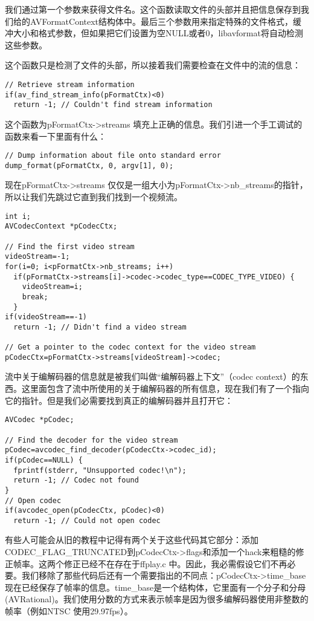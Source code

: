 我们通过第一个参数来获得文件名。这个函数读取文件的头部并且把信息保存到我们给的AVFormatContext结构体中。最后三个参数用来指定特殊的文件格式，缓冲大小和格式参数，但如果把它们设置为空NULL或者0，libavformat将自动检测这些参数。

这个函数只是检测了文件的头部，所以接着我们需要检查在文件中的流的信息：
\begin{lstlisting}
// Retrieve stream information
if(av_find_stream_info(pFormatCtx)<0)
  return -1; // Couldn't find stream information
\end{lstlisting}

这个函数为pFormatCtx->streams 填充上正确的信息。我们引进一个手工调试的
函数来看一下里面有什么：
\begin{lstlisting}
// Dump information about file onto standard error
dump_format(pFormatCtx, 0, argv[1], 0);
\end{lstlisting}

现在pFormatCtx->streams 仅仅是一组大小为pFormatCtx->nb_streams的指针，所以让我们先跳过它直到我们找到一个视频流。
\begin{lstlisting}
int i;
AVCodecContext *pCodecCtx;

// Find the first video stream
videoStream=-1;
for(i=0; i<pFormatCtx->nb_streams; i++)
  if(pFormatCtx->streams[i]->codec->codec_type==CODEC_TYPE_VIDEO) {
    videoStream=i;
    break;
  }
if(videoStream==-1)
  return -1; // Didn't find a video stream

// Get a pointer to the codec context for the video stream
pCodecCtx=pFormatCtx->streams[videoStream]->codec;
\end{lstlisting}

流中关于编解码器的信息就是被我们叫做“编解码器上下文”（codec context）的东西。这里面包含了流中所使用的关于编解码器的所有信息，现在我们有了一个指向它的指针。但是我们必需要找到真正的编解码器并且打开它：
\begin{lstlisting}
AVCodec *pCodec;

// Find the decoder for the video stream
pCodec=avcodec_find_decoder(pCodecCtx->codec_id);
if(pCodec==NULL) {
  fprintf(stderr, "Unsupported codec!\n");
  return -1; // Codec not found
}
// Open codec
if(avcodec_open(pCodecCtx, pCodec)<0)
  return -1; // Could not open codec
\end{lstlisting}

有些人可能会从旧的教程中记得有两个关于这些代码其它部分：添加CODEC_FLAG_TRUNCATED到pCodecCtx->flags和添加一个hack来粗糙的修正帧率。这两个修正已经不在存在于ffplay.c 中。因此，我必需假设它们不再必要。我们移除了那些代码后还有一个需要指出的不同点：pCodecCtx->time_base 现在已经保存了帧率的信息。time_base是一个结构体，它里面有一个分子和分母(AVRational)。我们使用分数的方式来表示帧率是因为很多编解码器使用非整数的帧率（例如NTSC 使用29.97fps）。

